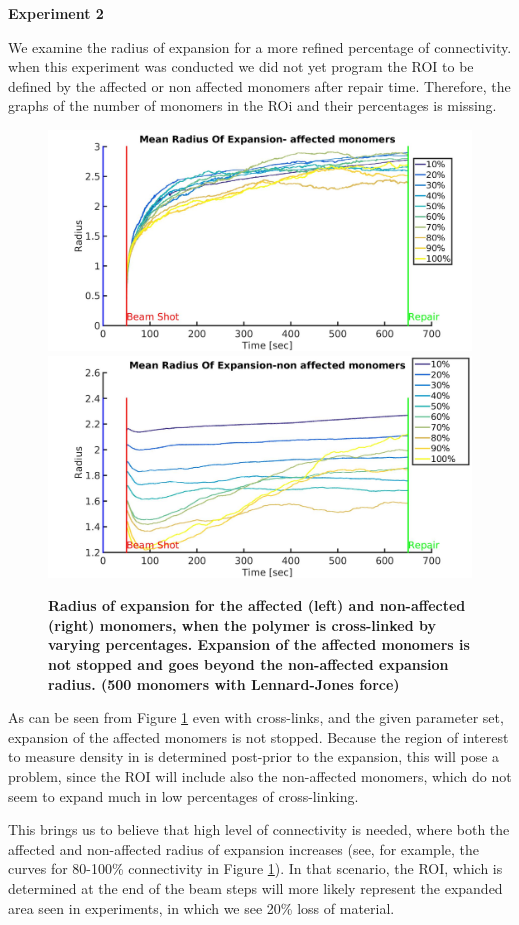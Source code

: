 \documentclass[12pt]{report}
\begin{document}
				
	     \textbf{Experiment 2}
		     
	     We examine the radius of expansion for a more refined percentage of connectivity. when this experiment was conducted we did not yet program the ROI to be defined by the affected or non affected monomers after repair time. Therefore, the graphs of the number of monomers in the ROi and their percentages is missing. 
		     	     
	 	\begin{figure}[H]
	     \includegraphics[width=0.5\linewidth,height=0.3\textheight]{RadiusOfExpansion500BeadsAffectedLennardJonesCrosslinked}
	     \includegraphics[width=0.5\linewidth,height=0.3\textheight]{RadiusOfExpansion500BeadsNonAffectedLennardJonesCrosslinked}
	      \caption{\tiny{\textbf{Radius of expansion for the affected (left) and non-affected (right) monomers, when the polymer is cross-linked by varying percentages. Expansion of the affected monomers is not stopped and goes beyond the non-affected expansion radius. (500 monomers with Lennard-Jones force)}}}
		     \label{fig:RadiusOfExpansion500BeadsAffectedLennardJonesCrosslinked}
    	\end{figure}
		      		
     	As can be seen from Figure \ref{fig:RadiusOfExpansion500BeadsAffectedLennardJonesCrosslinked} even with cross-links, and the given parameter set, expansion of the affected monomers is not stopped. 
	  	Because the region of interest to measure density in is determined post-prior to the expansion, this will pose a problem, since the ROI will include also the non-affected monomers, which do not seem to expand much in low percentages of cross-linking.
		      		
	  	This brings us to believe that high level of connectivity is needed, where both the affected and non-affected radius of expansion increases (see, for example, the curves for 80-100\% connectivity in Figure \ref{fig:RadiusOfExpansion500BeadsAffectedLennardJonesCrosslinked}). In that scenario, the ROI, which is determined at the end of the beam steps will more likely represent the expanded area seen in experiments, in which we see 20\% loss of material. 
		      		
\end{document}
